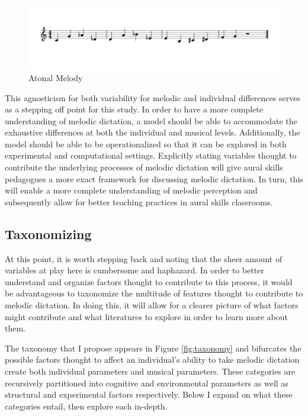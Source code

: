 \documentclass[12pt,]{book}
\begin{document}
\begin{figure}

{\centering \includegraphics[width=1\linewidth]{img/musicalexamples/MMD_Figure3-1} 

}

\caption{Atonal Melody}\label{fig:shortmelody2}
\end{figure}

This agnosticism for both variability for melodic and individual differences serves as a stepping off point for this study.
In order to have a more complete understanding of melodic dictation, a model should be able to accommodate the exhaustive differences at both the individual and musical levels.
Additionally, the model should be able to be operationalized so that it can be explored in both experimental and computational settings.
Explicitly stating variables thought to contribute the underlying processes of melodic dictation will give aural skills pedagogues a more exact framework for discussing melodic dictation.
In turn, this will enable a more complete understanding of melodic perception and subsequently allow for better teaching practices in aural skills classrooms.

\hypertarget{taxonomizing}{%
\subsection{Taxonomizing}\label{taxonomizing}}

At this point, it is worth stepping back and noting that the sheer amount of variables at play here is cumbersome and haphazard.
In order to better understand and organize factors thought to contribute to this process, it would be advantageous to taxonomize the multitude of features thought to contribute to melodic dictation.
In doing this, it will allow for a clearer picture of what factors might contribute and what literatures to explore in order to learn more about them.

The taxonomy that I propose appears in Figure \ref{fig:taxonomy} and bifurcates the possible factors thought to affect an individual's ability to take melodic dictation create both individual parameters and musical parameters.
These categories are recursively partitioned into cognitive and environmental parameters as well as structural and experimental factors respectively.
Below I expand on what these categories entail, then explore each in-depth.
\end{document}
